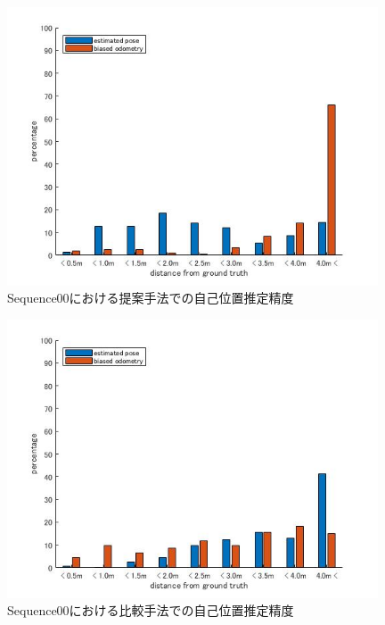 \begin{figure}[htbp]
 \begin{minipage}{1.0\hsize}
  \begin{center}
   \includegraphics[width=110mm]{./picture/mesh_s0_xyz.jpg}
  \end{center}
  \caption{Sequence00における提案手法での自己位置推定精度}
  \label{fig:mesh_sequence00_XYZ}
 \end{minipage}
\end{figure}

\begin{figure}[htbp]
 \begin{minipage}{1.0\hsize}
  \begin{center}
   \includegraphics[width=110mm]{./picture/point_s0_xyz.jpg}
  \end{center}
  \caption{Sequence00における比較手法での自己位置推定精度}
  \label{fig:point_sequence00_XYZ}
 \end{minipage}
\end{figure}
 

